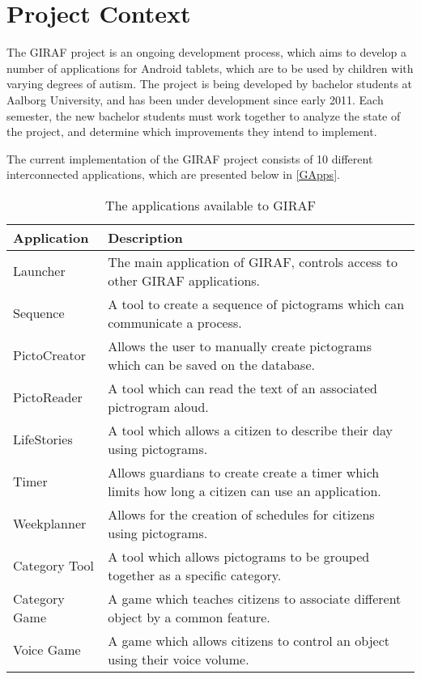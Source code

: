 \chapter{Project Context}
The GIRAF project is an ongoing development process, which aims to develop a
number of applications for Android tablets, which are to be used by children
with varying degrees of autism. The project is being developed by bachelor students
at Aalborg University, and has been under development since early 2011. Each
semester, the new bachelor students must work together to analyze the state of
the project, and determine which improvements they intend to implement.\nl

The current implementation of the GIRAF project consists of 10 different
interconnected applications, which are presented below in \autoref{GApps}.


\begin{table}[H]
\centering
\begin{tabular}{|p{3cm}|p{9cm}|}
\hline
Application			& Description \\\hline
Launcher  			& The main application of GIRAF, controls access to other
GIRAF applications. \\\hline 
Sequence	       	& A tool to create a sequence of pictograms which can
communicate a process.\\\hline 
PictoCreator  	   	& Allows the user to manually create pictograms which can be
saved on the database.\\\hline
PictoReader	   		& A tool which can read the text of an associated pictrogram
aloud.\\\hline
LifeStories	   		& A tool which allows a citizen to describe their day using
pictograms.\\\hline 
Timer     	   		& Allows guardians to create create a timer which limits how
long a citizen can use an application.\\\hline 
Weekplanner 		& Allows for the creation of schedules for citizens
using pictograms. \\\hline 
Category Tool		& A tool which allows pictograms to be grouped together as a
specific category. \\\hline 
Category Game   	& A game which teaches citizens to associate different object
by a common feature. \\\hline 
Voice Game  		& A game which allows citizens to control an object using their
voice volume. \\\hline
\end{tabular}
\label{GApps} 
\caption{The applications available to GIRAF}
\end{table}

